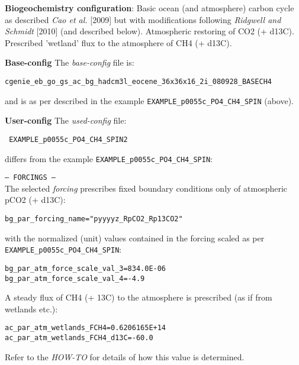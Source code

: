 \documentclass[10pt,twoside]{article}
\begin{document}
\noindent \textbf{Biogeochemistry configuration}: Basic ocean (and atmosphere) carbon cycle as described \textit{Cao et al.} [2009] but with modifications following \textit{Ridgwell and Schmidt} [2010] (and described below). Atmospheric restoring of CO2 (+ d13C). Prescribed 'wetland' flux to the atmosphere of CH4 (+ d13C).

\noindent \textbf{Base-config} The \textit{base-config} file is:
\vspace{-10pt}\begin{verbatim}cgenie_eb_go_gs_ac_bg_hadcm3l_eocene_36x36x16_2i_080928_BASECH4 \end{verbatim}\vspace{-10pt}
and is as per described in the example \texttt{EXAMPLE\_p0055c\_PO4\_CH4\_SPIN} (above).

\noindent \textbf{User-config} The \textit{used-config} file:
\vspace{-10pt}\begin{verbatim} EXAMPLE_p0055c_PO4_CH4_SPIN2 \end{verbatim}\vspace{-10pt}
differs from the example \texttt{EXAMPLE\_p0055c\_PO4\_CH4\_SPIN}:
\begin{compactitem}
		\item \texttt{--- FORCINGS ---}
	\\ The selected \textit{forcing} prescribes fixed boundary conditions only of atmospheric pCO2 (+ d13C):
\vspace{-5pt}\begin{verbatim}bg_par_forcing_name="pyyyyz_RpCO2_Rp13CO2"\end{verbatim}\vspace{-5pt}
with the normalized (unit) values contained in the forcing scaled as per \texttt{EXAMPLE\_p0055c\_PO4\_CH4\_SPIN}:
	\vspace{-5pt}\begin{verbatim}
bg_par_atm_force_scale_val_3=834.0E-06
bg_par_atm_force_scale_val_4=-4.9
		\end{verbatim}\vspace{-5pt}
			A steady flux of CH4 (+ 13C) to the atmosphere is prescribed (as if from wetlands etc.):
	\vspace{-5pt}\begin{verbatim}
ac_par_atm_wetlands_FCH4=0.6206165E+14
ac_par_atm_wetlands_FCH4_d13C=-60.0
		\end{verbatim}\vspace{-5pt}
Refer to the \textit{HOW-TO} for details of how this value is determined.
	\end{compactitem}
\end{document}
